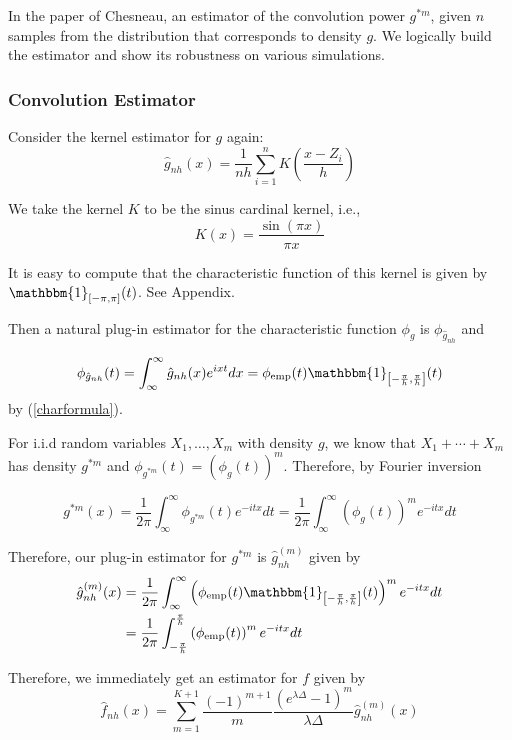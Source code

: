 \documentclass[a4paper,11pt]{article}
\theoremstyle{theorem}
\theoremstyle{definition}
\theoremstyle{remark}
\begin{document}
In the paper of Chesneau, an estimator of the convolution power $g^{\ast m}$, given $n$ samples from the distribution that corresponds to density $g$.
We logically build the estimator and show its robustness on various simulations.

\subsubsection{Convolution Estimator}

Consider the kernel estimator for $g$ again:
\[
\hat{g}_{nh}(x) = \frac{1}{nh}\sum_{i=1}^{n}{K\left(\frac{x - Z_i}{h}\right)}
\] 

We take the kernel $K$ to be the sinus cardinal kernel, i.e.,
\[
K(x) = \frac{\sin(\pi x)}{\pi x}
\]

It is easy to compute that the characteristic function of this kernel is given by $\mathbbm{1}_{[-\pi, \pi]}(t)$. See Appendix.

Then a natural plug-in estimator for the characteristic function $\phi_{g}$ is $\phi_{\hat{g}_{nh}}$ and

\begin{equation}
\phi_{\hat{g}_{nh}}(t) = \int_{\infty}^{\infty}{\hat{g}_{nh}(x) e^{ixt} dx} = \phi_{\text{emp}}(t) \mathbbm{1}_{\left[-\frac{\pi}{h}, \frac{\pi}{h}\right]}(t)
\end{equation}
by (\ref{charformula}).

For i.i.d random variables $X_1, \dotsc, X_m$ with density $g$, we know that $X_1 + \dotsb + X_m$ has density $g^{\ast m}$ and $\phi_{g^{\ast m}}(t) = (\phi_{g}(t))^m$. Therefore, by Fourier inversion

\begin{equation}
g^{\ast m}(x) = \frac{1}{2\pi}\int_{\infty}^{\infty}{\phi_{g^{\ast m}}(t) e^{-itx} dt} = \frac{1}{2\pi}\int_{\infty}^{\infty}{(\phi_{g}(t))^m e^{-itx} dt}
\end{equation}

Therefore, our plug-in estimator for $g^{\ast m}$ is $\hat{g}_{nh}^{(m)}$ given by
\begin{align*}
\hat{g}_{nh}^{(m)}(x) &= \frac{1}{2\pi}\int_{\infty}^{\infty}{\left(\phi_{\text{emp}}(t) \mathbbm{1}_{\left[-\frac{\pi}{h}, \frac{\pi}{h}\right]}(t)\right)^{m} e^{-itx} dt} \\
&= \frac{1}{2\pi}\int_{-\frac{\pi}{h}}^{\frac{\pi}{h}}{\left(\phi_{\text{emp}}(t)\right)^{m} e^{-itx} dt}
\end{align*}

Therefore, we immediately get an estimator for $f$ given by
\begin{equation}
\hat{f}_{nh}(x) = \sum_{m=1}^{K+1}{\frac{(-1)^{m+1}}{m}\frac{(e^{\lambda \Delta} - 1)^m}{\lambda \Delta} \hat{g}_{nh}^{(m)}(x)}
\end{equation}
\end{document}
